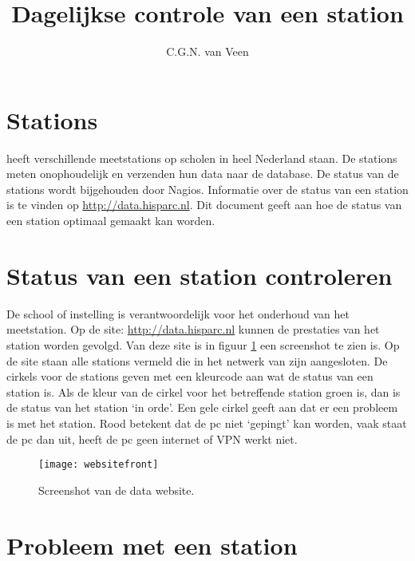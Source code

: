 



\title{Dagelijkse controle van een station} \author{C.G.N. van Veen}
\date{}

\maketitle

\section{Stations}

\hisparc heeft verschillende meetstations op scholen in heel Nederland
staan. De stations meten onophoudelijk en verzenden hun data naar de \hisparc database. 
De status van de \hisparc stations wordt bijgehouden door Nagios. 
Informatie over de status van een station is te vinden op \url{http://data.hisparc.nl}. 
Dit document geeft aan hoe de status van een station optimaal gemaakt kan worden.

\section{Status van een station controleren}

De school of instelling is verantwoordelijk voor het onderhoud van het meetstation. 
Op de site: \url{http://data.hisparc.nl} kunnen de prestaties van het station worden gevolgd. Van deze site is in figuur
\ref{fig:frontweb} een screenshot te zien is. Op de site staan alle
stations vermeld die in het netwerk van \hisparc zijn aangesloten. De
cirkels voor de stations geven met een kleurcode aan wat de status van
een station is. Als de kleur van de cirkel voor het betreffende station
groen is, dan is de status van het station `in orde'. Een gele cirkel
geeft aan dat er een probleem is met het station. Rood betekent dat de pc
niet `gepingt' kan worden, vaak staat de pc dan uit, heeft de pc geen internet of VPN werkt niet.

\begin{figure} \centering \texttt{[image: websitefront]}
\caption{Screenshot van de \hisparc data website.} 
\label{fig:frontweb}
\end{figure}

\section{Probleem met een station}

